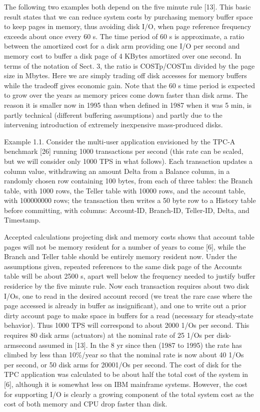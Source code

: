 \documentclass[a4paper,12pt,notitlepage,twoside,openright]{article}
\begin{document}
The following two examples both depend on the five minute rule {[}13{]}.
This basic result states that we can reduce system costs by purchasing
memory buffer space to keep pages in memory, thus avoiding disk I/O,
when page reference frequency exceeds about once every 60 s. The time
period of 60 s is approximate, a ratio between the amortized cost for a
disk arm providing one I/O per second and memory cost to buffer a disk
page of 4 KBytes amortized over one second. In terms of the notation of
Sect. 3, the ratio is COSTp/COSTm divided by the page size in Mbytes.
Here we are simply trading off disk accesses for memory buffers while
the tradeoff gives economic gain. Note that the 60 s time period is
expected to grow over the years as memory prices come down faster than
disk arms. The reason it is smaller now in 1995 than when defined in
1987 when it was 5 min, is partly technical (different buffering
assumptions) and partly due to the intervening introduction of extremely
inexpensive mass-produced disks.

Example 1.1. Consider the multi-user application envisioned by the TPC-A
benchmark {[}26{]} running 1000 transactions per second (this rate can
be scaled, but we will consider only 1000 TPS in what follows). Each
transaction updates a column value, withdrawing an amount Delta from a
Balance column, in a randomly chosen row containing 100 bytes, from each
of three tables: the Branch table, with 1000 rows, the Teller table with
10000 rows, and the account table, with 100000000 rows; the transaction
then writes a 50 byte row to a History table before committing, with
columns: Account-ID, Branch-ID, Teller-ID, Delta, and Timestamp.

Accepted calculations projecting disk and memory costs shows that
account table pages will not be memory resident for a number of years to
come {[}6{]}, while the Branch and Teller table should be entirely
memory resident now. Under the assumptions given, repeated references to
the same disk page of the Accounts table will be about 2500 s, apart
well below the frequency needed to justify buffer residerice by the five
minute rule. Now each transaction requires about two disk I/Os, one to
read in the desired account record (we treat the rare case where the
page accessed is already in buffer as insignificant), and one to write
out a prior dirty account page to make space in buffers for a read
(necessary for steady-state behavior). Thus 1000 TPS will correspond to
about 2000 1/Os per second. This requires 80 disk arms (actuators) at
the nominal rate of 25 1/Os per disk-armsecond assumed in {[}13{]}. In
the 8 yr since then (1987 to 1995) the rate has climbed by less than
10\%/year so that the nominal rate is now about 40 1/Os per second, or
50 disk arms for 20001/Os per second. The cost of disk for the TPC
application was calculated to be about half the total cost of the system
in {[}6{]}, although it is somewhat less on IBM mainframe systems.
However, the cost for supporting I/O is clearly a growing component of
the total system cost as the cost of both memory and CPU drop faster
than disk.
\end{document}
